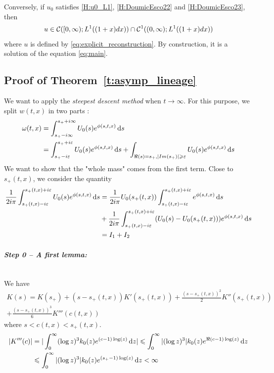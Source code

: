 Conversely, if $u_0$ satisfies \eqref{H:u0_L1}, \eqref{H:DoumicEsco22} and \eqref{H:DoumicEsco23}, then 
 $$u \in \mathcal{C}([0, \infty); L^1((1+x)dx)) \cap \mathcal{C}^1((0, \infty); L^1((1+x)dx))$$
where $u$ is defined by \eqref{eq:explicit_reconstruction}. By construction, it is a solution of the equation \eqref{eq:main}.

\subsection{Proof of Theorem~\ref{t:asymp_lineage}}
\label{proof:asymp_lineage}

We want to apply the \textit{steepest descent method} when $t \to \infty$. For this purpose, we split $w(t,x)$ in two parts : 
\begin{align*}
    \omega(t,x)
        &= \int_{s_+-i\infty}^{s_++i\infty} U_0(s)e^{\phi(s, t, x)} \, \mathrm ds \\
        &= \int_{s_+-i\varepsilon}^{s_++i\varepsilon} U_0(s) e^{\phi(s, t, x)} \, \mathrm ds 
        +\int_{\Re(s) = s_+, |Im(s_+)| \geqslant \varepsilon} U_0(s) e^{\phi(s, t, x)} \, \mathrm ds \\
\end{align*}
We want to show that the "whole mass" comes from the first term. Close to $s_+(t,x)$, we consider the quantity
    \begin{align*}
    \frac{1}{2i \pi} \int_{s_+(t,x) - i\varepsilon}^{s_+(t,x) + i\varepsilon} U_0(s) e^{\phi(s,t,x)} \, \mathrm ds 
    &=
    \frac{1}{2i \pi} U_0(s_+(t,x)) \int_{s_+(t,x) - i\varepsilon}^{s_+(t,x) + i\varepsilon} e^{\phi(s,t,x)} \, \mathrm ds
    \\
    & + 
    \frac{1}{2i \pi} \int_{s_+(t,x) - i\varepsilon}^{s_+(t,x) + i\varepsilon} (U_0(s) -  U_0(s_+(t,x)))  e^{\phi(s,t,x)} \, \mathrm ds \\
    &= I_1 + I_2
    \end{align*}

\paragraph{\textit{Step 0 -- A first lemma:}}\mbox{}\\
We have
\begin{equation}
    \begin{split}
    K(s) = K(s_+) + (s - s_+(t,x)) K'(s_+(t,x)) + \frac{(s - s_+(t,x))^2}{2} K''(s_+(t,x)) \\+ \frac{(s - s_+(t,x))^3}{6} K'''(c(t,x))
    \end{split}
\end{equation}
where $s < c(t,x) < s_+(t,x)$.
    \begin{align*}
         |K'''(c)|
         &= |\int_0^\infty (\log z)^3 k_0(z) e^{(c-1)\log(z)}\, \mathrm dz|
         \leqslant \int_0^\infty |(\log z)^3| k_0(z)  e^{\Re (c-1)\log(z)}\, \mathrm dz \\
         &\leqslant  \int_0^\infty |(\log z)^3| k_0(z)  e^{(s_+-1)\log(z)}\, \mathrm dz < \infty
    \end{align*}
    
